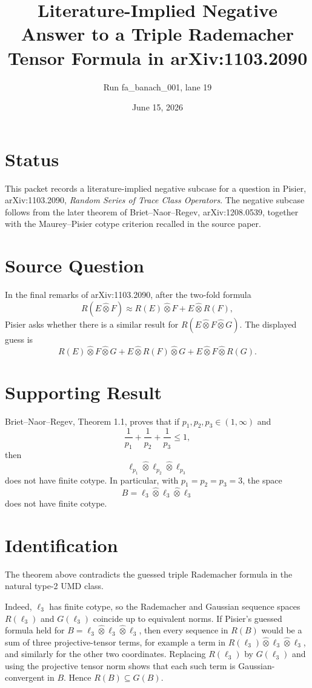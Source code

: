 \documentclass[11pt]{article}
\title{Literature-Implied Negative Answer to a Triple Rademacher Tensor Formula in arXiv:1103.2090}
\author{Run fa\_banach\_001, lane 19}
\date{June 15, 2026}
\newcommand{\whotimes}{\widehat{\otimes}}
\newcommand{\ellthree}{\ell_3}
\begin{document}
\maketitle

\section*{Status}

This packet records a literature-implied negative subcase for a question in
Pisier, arXiv:1103.2090, \emph{Random Series of Trace Class Operators}. The
negative subcase follows from the later theorem of Briet--Naor--Regev,
arXiv:1208.0539, together with the Maurey--Pisier cotype criterion recalled in
the source paper.

\section*{Source Question}

In the final remarks of arXiv:1103.2090, after the two-fold formula
\[
R(E\whotimes F) \approx R(E)\whotimes F + E\whotimes R(F),
\]
Pisier asks whether there is a similar result for
$R(E\whotimes F\whotimes G)$. The displayed guess is
\[
R(E)\whotimes F\whotimes G
+E\whotimes R(F)\whotimes G
+E\whotimes F\whotimes R(G).
\]

\section*{Supporting Result}

Briet--Naor--Regev, Theorem 1.1, proves that if
$p_1,p_2,p_3\in(1,\infty)$ and
\[
\frac1{p_1}+\frac1{p_2}+\frac1{p_3}\leq 1,
\]
then
\[
\ell_{p_1}\whotimes \ell_{p_2}\whotimes \ell_{p_3}
\]
does not have finite cotype. In particular, with
$p_1=p_2=p_3=3$, the space
\[
B=\ellthree\whotimes \ellthree\whotimes \ellthree
\]
does not have finite cotype.

\section*{Identification}

The theorem above contradicts the guessed triple Rademacher formula in the
natural type-2 UMD class.

Indeed, $\ellthree$ has finite cotype, so the Rademacher and Gaussian sequence
spaces $R(\ellthree)$ and $G(\ellthree)$ coincide up to equivalent norms. If
Pisier's guessed formula held for
$B=\ellthree\whotimes\ellthree\whotimes\ellthree$, then every sequence in
$R(B)$ would be a sum of three projective-tensor terms, for example a term in
$R(\ellthree)\whotimes\ellthree\whotimes\ellthree$, and similarly for the
other two coordinates. Replacing $R(\ellthree)$ by $G(\ellthree)$ and using
the projective tensor norm shows that each such term is Gaussian-convergent in
$B$. Hence $R(B)\subseteq G(B)$.
\end{document}
